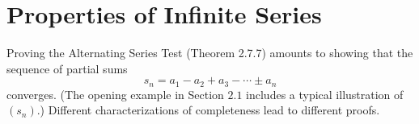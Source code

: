 \section{Properties of Infinite Series}

\begin{exercise}
  Proving the Alternating Series Test (Theorem 2.7.7) amounts to showing that the sequence of partial sums
  $$
  s_{n}=a_{1}-a_{2}+a_{3}-\cdots \pm a_{n}
  $$
  converges. (The opening example in Section $2.1$ includes a typical illustration of $\left(s_{n}\right)$.) Different characterizations of completeness lead to different proofs.

\end{exercise}

